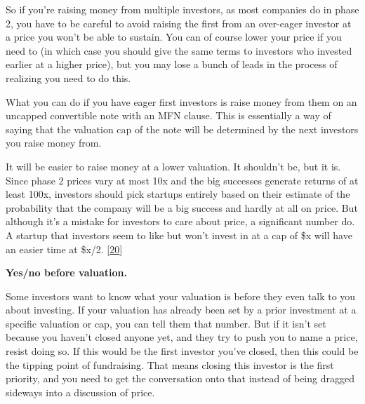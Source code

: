 So
                    if you're raising money from multiple investors, as most
                    companies do in phase 2, you have to be careful to avoid
                    raising the first from an over-eager investor at a price you
                    won't be able to sustain. You can of course lower your price
                    if you need to (in which case you should give the same terms
                    to investors who invested earlier at a higher price), but
                    you may lose a bunch of leads in the process of realizing
                    you need to do this.

What you can do if you have
                    eager first investors is raise money from them on an
                    uncapped convertible note with an MFN clause. This is
                    essentially a way of saying that the valuation cap of the
                    note will be determined by the next investors you raise
                    money from.

It will be easier to raise money at a
                    lower valuation. It shouldn't be, but it is. Since phase 2
                    prices vary at most 10x and the big successes generate
                    returns of at least 100x, investors should pick startups
                    entirely based on their estimate of the probability that the
                    company will be a big success and hardly at all on price.
                    But although it's a mistake for investors to care about
                    price, a significant number do. A startup that investors
                    seem to like but won't invest in at a cap of \$x will have an
                    easier time at \$x/2.
                    [\href{\#f20n}{20}]


                    \textbf{Yes/no before valuation.}

Some investors
                    want to know what your valuation is before they even talk to
                    you about investing. If your valuation has already been set
                    by a prior investment at a specific valuation or cap, you
                    can tell them that number. But if it isn't set because you
                    haven't closed anyone yet, and they try to push you to name
                    a price, resist doing so. If this would be the first
                    investor you've closed, then this could be the tipping point
                    of fundraising. That means closing this investor is the
                    first priority, and you need to get the conversation onto
                    that instead of being dragged sideways into a discussion of
                    price.

